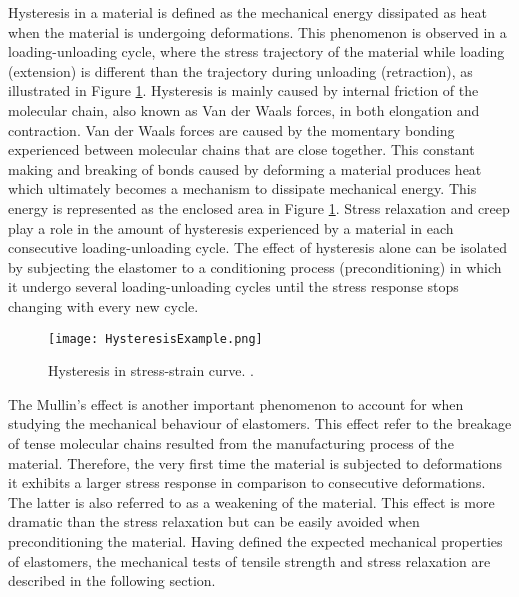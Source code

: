 Hysteresis in a material is defined as the mechanical energy dissipated as heat when the material is undergoing deformations. This phenomenon is observed in a loading-unloading cycle, where the stress trajectory of the material while loading (extension) is different than the trajectory during unloading (retraction), as illustrated in Figure \ref{fig:hysteresis}. Hysteresis is mainly caused by internal friction of the molecular chain, also known as Van der Waals forces, in both elongation and contraction. Van der Waals forces are caused by the momentary bonding experienced between molecular chains that are close together. This constant making and breaking of bonds caused by deforming a material produces heat which ultimately becomes a mechanism to dissipate mechanical energy. This energy is represented as the enclosed area in Figure \ref{fig:hysteresis}. Stress relaxation and creep play a role in the amount of hysteresis experienced by a material in each consecutive loading-unloading cycle. The effect of hysteresis alone can be isolated by subjecting the elastomer to a conditioning process (preconditioning) in which it undergo several loading-unloading cycles until the stress response stops changing with every new cycle.

\begin{figure}[h!]
    \centering
    \texttt{[image: HysteresisExample.png]}
    \caption{Hysteresis in stress-strain curve. \cite{Bauman2008}.}
    \label{fig:hysteresis}
\end{figure}

The Mullin's effect is another important phenomenon to account for when studying the mechanical behaviour of elastomers. This effect refer to the breakage of tense molecular chains resulted from the manufacturing process of the material. Therefore, the very first time the material is subjected to deformations it exhibits a larger stress response in comparison to consecutive deformations. The latter is also referred to as a weakening of the material. This effect is more dramatic than the stress relaxation but can be easily avoided when preconditioning the material. Having defined the expected mechanical properties of elastomers, the mechanical tests of tensile strength and stress relaxation are described in the following section.


